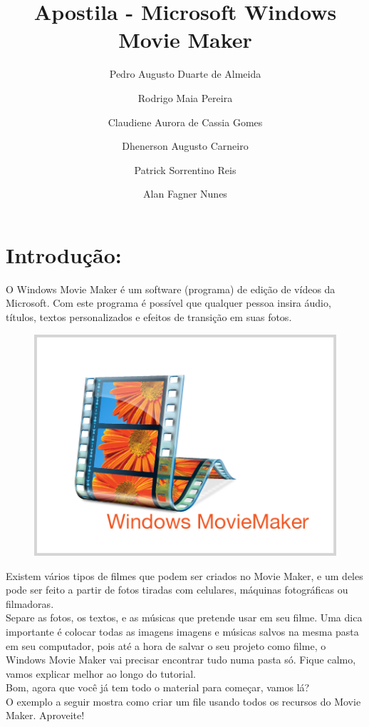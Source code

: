 \documentclass{article}
\title{Apostila - Microsoft Windows Movie Maker}
\author{
    Pedro Augusto Duarte de Almeida\\
    \and
    Rodrigo Maia Pereira\\
    \and
    Claudiene Aurora de Cassia Gomes\\
    \and
    Dhenerson Augusto Carneiro\\
    \and
    Patrick Sorrentino Reis\\
    \and
    Alan Fagner Nunes\\
}
\date{}
\begin{document}
\maketitle

\section{Introdução:}
O Windows Movie Maker é um software (programa) de edição de vídeos da Microsoft.
Com este programa é possível que qualquer pessoa insira áudio, títulos, textos personalizados e efeitos de transição em suas fotos.

\begin{figure}[h!]
\centering
\includegraphics[scale=0.35]{movie-maker.png}
\end{figure} 

Existem vários tipos de filmes que podem ser criados no Movie Maker, e um deles pode ser feito a partir de fotos tiradas com celulares, máquinas fotográficas ou filmadoras.\\

Separe as fotos, os textos, e as músicas que pretende usar em seu filme. Uma dica importante é colocar todas as imagens imagens e músicas salvos na mesma pasta em seu computador, pois até a hora de salvar o seu projeto como filme, o Windows Movie Maker vai precisar encontrar tudo numa pasta só. Fique calmo, vamos explicar melhor ao longo do tutorial. \\

Bom, agora que você já tem todo o material para começar, vamos lá?\\

O exemplo a seguir mostra como criar um file usando todos os recursos do
Movie Maker. Aproveite!
\end{document}
